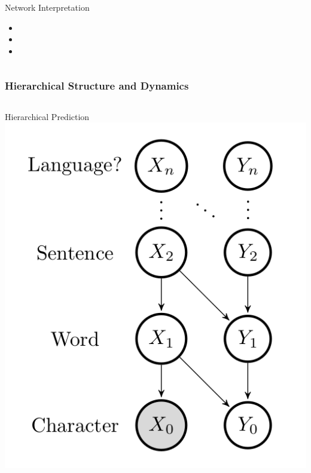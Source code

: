 \begin{frame}
\begin{columns}
\begin{column}{0.5\textwidth}
\begin{block}{Network Interpretation}
        \begin{itemize}
          \item
          \item
          \item
        \end{itemize}
      \end{block}
    \end{column}
  \end{columns}
\end{frame}

\begin{frame}
  \frametitle{Hierarchical Structure and Dynamics}
  \begin{columns}
    \begin{column}{0.5\textwidth}
      \begin{block}{Hierarchical Prediction}
          \includegraphics[width=\textwidth]{images/idyot-seqmem-graph-model.png}
      \end{block}
    \end{column}

\end{columns}
\end{frame}
